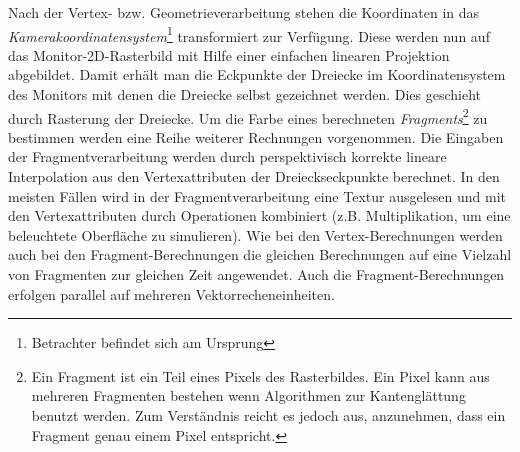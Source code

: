 \documentclass[twoside,a4paper,fleqn,12pt]{article}
\begin{document}
Nach der Vertex- bzw. Geometrieverarbeitung stehen die Koordinaten in das \emph{Kamerakoordinatensystem}\footnote{Betrachter befindet sich am
Ursprung} transformiert zur Verfügung. Diese werden nun auf das Monitor-2D-Rasterbild mit Hilfe einer einfachen linearen Projektion
abgebildet. Damit erhält man die Eckpunkte der Dreiecke im Koordinatensystem des Monitors mit denen die Dreiecke selbst
gezeichnet werden. Dies geschieht durch Rasterung der Dreiecke. Um die Farbe eines berechneten 
\emph{Fragments}\footnote{Ein Fragment ist ein Teil eines Pixels des Rasterbildes. Ein Pixel kann aus mehreren Fragmenten bestehen wenn 
Algorithmen zur Kantenglättung benutzt werden. Zum Verständnis reicht es jedoch aus, anzunehmen, dass ein Fragment genau einem Pixel entspricht.} zu 
bestimmen werden eine Reihe weiterer Rechnungen vorgenommen. Die Eingaben der Fragmentverarbeitung werden
durch perspektivisch korrekte lineare Interpolation aus den Vertexattributen der Drei\-ecks\-eck\-punk\-te  
berechnet. In den meisten Fällen wird in der Fragmentverarbeitung eine Textur ausgelesen
und mit den Vertexattributen durch Operationen kombiniert (z.B. Multiplikation, um eine beleuchtete Oberfläche zu simulieren).
Wie bei den Vertex-Berechnungen werden auch bei den Fragment-Berechnungen die gleichen Berechnungen auf eine Vielzahl
von Fragmenten zur gleichen Zeit angewendet. Auch die Fragment-Berechnungen erfolgen parallel auf mehreren Vektorrecheneinheiten.
\end{document}
